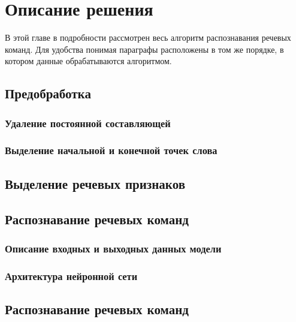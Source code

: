 \section{Описание решения}
В этой главе в подробности рассмотрен весь алгоритм распознавания речевых команд. Для удобства понимая параграфы расположены в том же порядке, в котором данные обрабатываются алгоритмом.

\subsection{Предобработка}
\subsubsection{Удаление постоянной составляющей}
\subsubsection{Выделение начальной и конечной точек слова}

\subsection{Выделение речевых признаков}



\subsection{Распознавание речевых команд}
\subsubsection{Описание входных и выходных данных модели}
\subsubsection{Архитектура нейронной сети}
\subsubsection{}


\subsection{Распознавание речевых команд}